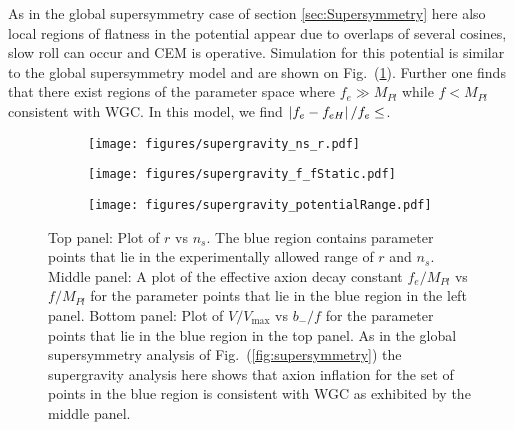 \documentclass[12pt]{article}
\begin{document}
As in the global supersymmetry case of section \ref{sec:Supersymmetry} here also local regions of flatness in the potential appear due to overlaps of several cosines, slow roll can occur and CEM is operative.
Simulation for this potential is similar to the global supersymmetry model and are shown on Fig.~(\ref{fig:supergravity}).
Further one finds that there exist regions of the parameter space where $f_e \gg M_{Pl}$ while $f < M_{Pl}$ consistent with WGC.
In this model, we find $\left|f_e - f_{eH}\right| / f_e \le \protect$.

\begin{figure}
  \centering
  \begin{subfigure}{0.5 \textwidth}
    \texttt{[image: figures/supergravity\_ns\_r.pdf]}
  \end{subfigure}
  \begin{subfigure}{0.5 \textwidth}
    \texttt{[image: figures/supergravity\_f\_fStatic.pdf]}
  \end{subfigure}
  \begin{subfigure}{0.55 \textwidth}
    \texttt{[image: figures/supergravity\_potentialRange.pdf]}
  \end{subfigure}
  \caption{\protect
    Top panel: Plot of $r$ vs $n_s$.
    The blue region contains parameter points that lie in the experimentally allowed range of $r$ and $n_s$.
    Middle panel: A plot of the effective axion decay constant $f_e / M_{Pl}$ vs $f / M_{Pl}$ for the parameter points that lie in the blue region in the left panel.
    Bottom panel: Plot of $V / V_\text{max}$ vs $b_- / f$ for the parameter points that lie in the blue region in the top panel.
    As in the global supersymmetry analysis of Fig.~(\ref{fig:supersymmetry}) the supergravity analysis here shows that axion inflation for the set of points in the blue region is consistent with WGC as exhibited by the middle panel.
  } \label{fig:supergravity}
\end{figure}
\end{document}
